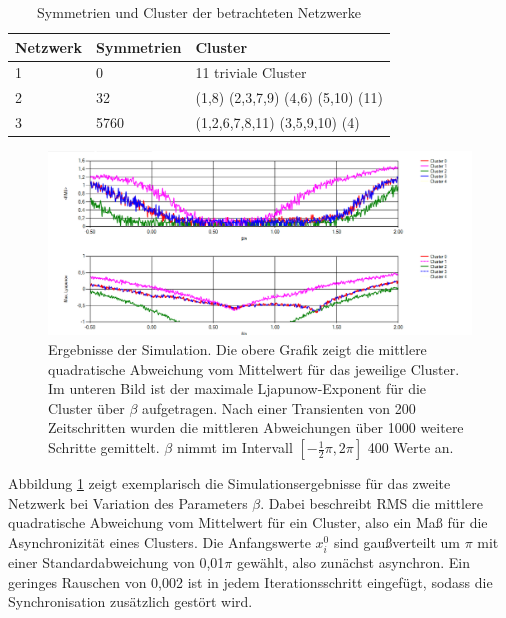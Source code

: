 \begin{table}[]
	\begin{center}
		\caption{Symmetrien und Cluster der betrachteten Netzwerke}
		\label{tab:netzwerke} 
		
		\begin{tabular}{lll}
			Netzwerk & Symmetrien & Cluster                           \\
			\hline
			1        & 0          & 11 triviale Cluster               \\
			2        & 32         & (1,8) (2,3,7,9) (4,6) (5,10) (11) \\
			3        & 5760       & (1,2,6,7,8,11) (3,5,9,10) (4) \\  
			\hline
		\end{tabular}
	\end{center}
\end{table}
\begin{figure}
	\centering
	\includegraphics[width=1.0\textwidth]{abb/misc/ljapResult.png}
	\caption{Ergebnisse der Simulation. Die obere Grafik zeigt die mittlere quadratische Abweichung vom Mittelwert für das jeweilige Cluster. Im unteren Bild ist der maximale Ljapunow-Exponent für die Cluster über $\beta$ aufgetragen. Nach einer Transienten von 200 Zeitschritten wurden die mittleren Abweichungen über 1000 weitere Schritte gemittelt. $\beta$ nimmt im Intervall $[-\frac{1}{2}\pi,2\pi]$ 400 Werte an.}
	\label{fig:ljapResult}
\end{figure}
Abbildung \ref{fig:ljapResult} zeigt exemplarisch die Simulationsergebnisse für das zweite Netzwerk bei Variation des Parameters $\beta$. Dabei beschreibt RMS die mittlere quadratische Abweichung vom Mittelwert für ein Cluster, also ein Maß für die Asynchronizität eines Clusters. Die Anfangswerte $x_i^0$ sind gaußverteilt um $\pi$ mit einer Standardabweichung von 0,01$\pi$ gewählt, also zunächst asynchron. Ein geringes Rauschen von 0,002 ist in jedem Iterationsschritt eingefügt, sodass die Synchronisation zusätzlich gestört wird.
